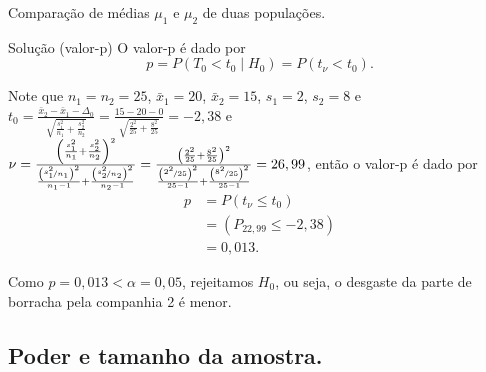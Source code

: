 \documentclass[9pt]{beamer}
\begin{document}
\begin{frame}{Comparação de médias $\mu_1$ e $\mu_2$ de duas populações.}

\begin{block}{Solução (valor-p)}
	O valor-p é dado por
	$$p = P (T_0 < t_0 \mid H_0) = P(t_\nu < t_0).$$
	
	Note que $n_1=n_2=25$, $\bar{x}_1=20$, $\bar{x}_2=15$, $s_1=2$, $s_2=8$ e $t_0 = \frac{\bar{x}_2 - \bar{x}_1- \Delta_0}{\sqrt{\frac{s_1^2}{n_1} + \frac{s_2^2}{n_2}}} = \frac{15 - 20  - 0}{\sqrt{\frac{2^2}{25} + \frac{8^2}{25}}}=-2,38$ e $\nu = \frac{\left( \frac{s_1^2}{n_1} + \frac{s_2^2}{n_2} \right)^2}{\frac{\left(\nicefrac{s_1^2}{n_1}\right)^2}{n_1-1} + \frac{\left(\nicefrac{s_2^2}{n_2}\right)^2}{n_2-1}} = \frac{\left( \frac{2^2}{25} + \frac{8^2}{25} \right)^2}{\frac{\left(\nicefrac{2^2}{25}\right)^2}{25-1} + \frac{\left(\nicefrac{8^2}{25}\right)^2}{25-1}} = 26,99$, então o valor-p é dado por
	\begin{align*}
		p &= P(t_\nu \leq t_0)\\
		&= (P_{22,99} \leq -2,38)\\
		&= 0,013.
	\end{align*}
	
	Como $p=0,013 < \alpha=0,05$, rejeitamos $H_0$, ou seja, o desgaste da parte de borracha pela companhia 2 é menor.
\end{block}

\end{frame}


\subsection{Poder e tamanho da amostra.}
\end{document}
